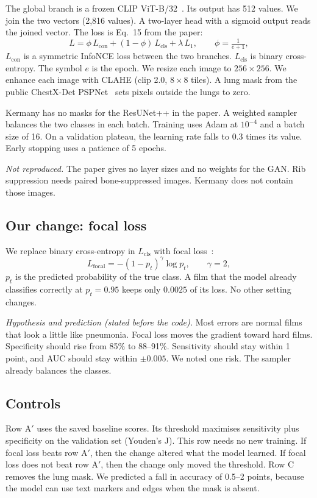 \documentclass[conference]{IEEEtran}
\begin{document}
The global branch is a frozen CLIP ViT-B/32~\cite{radford2021}. Its output has 512 values. We join the two vectors (2{,}816 values). A two-layer head with a sigmoid output reads the joined vector. The loss is Eq.~15 from the paper:
\begin{equation}
L = \phi\,L_{\text{con}} + (1-\phi)\,L_{\text{cls}} + \lambda\,L_{1},\qquad \phi = \tfrac{1}{e+1},
\end{equation}
$L_{\text{con}}$ is a symmetric InfoNCE loss between the two branches. $L_{\text{cls}}$ is binary cross-entropy. The symbol $e$ is the epoch. We resize each image to $256\times256$. We enhance each image with CLAHE (clip 2.0, $8\times8$ tiles). A lung mask from the public ChestX-Det PSPNet~\cite{cohen2022} sets pixels outside the lungs to zero.

Kermany has no masks for the ResUNet++ in the paper. A weighted sampler balances the two classes in each batch. Training uses Adam at $10^{-4}$ and a batch size of 16. On a validation plateau, the learning rate falls to $0.3$ times its value. Early stopping uses a patience of 5 epochs.

\textit{Not reproduced.} The paper gives no layer sizes and no weights for the GAN. Rib suppression needs paired bone-suppressed images. Kermany does not contain those images.

\subsection{Our change: focal loss}
We replace binary cross-entropy in $L_{\text{cls}}$ with focal loss~\cite{lin2017}:
\begin{equation}
L_{\text{focal}} = -(1-p_t)^{\gamma}\log p_t,\qquad \gamma = 2,
\end{equation}
$p_t$ is the predicted probability of the true class. A film that the model already classifies correctly at $p_t = 0.95$ keeps only $0.0025$ of its loss. No other setting changes.

\textit{Hypothesis and prediction (stated before the code).} Most errors are normal films that look a little like pneumonia. Focal loss moves the gradient toward hard films. Specificity should rise from 85\% to 88--91\%. Sensitivity should stay within 1 point, and AUC should stay within $\pm0.005$. We noted one risk. The sampler already balances the classes.

\subsection{Controls}
Row A$'$ uses the saved baseline scores. Its threshold maximises sensitivity plus specificity on the validation set (Youden's J). This row needs no new training. If focal loss beats row A$'$, then the change altered what the model learned. If focal loss does not beat row A$'$, then the change only moved the threshold. Row C removes the lung mask. We predicted a fall in accuracy of 0.5--2 points, because the model can use text markers and edges when the mask is absent.
\end{document}
